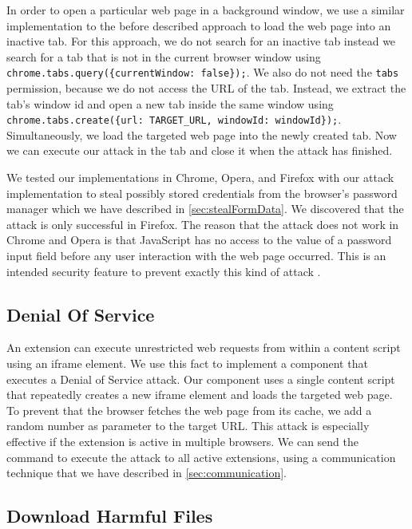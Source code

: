 	In order to open a particular web page in a background window, we use a similar implementation to the before described approach to load the web page into an inactive tab. For this approach, we do not search for an inactive tab instead we search for a tab that is not in the current browser window using \lstinline|chrome.tabs.query({currentWindow: false});|. We also do not need the \texttt{tabs} permission, because we do not access the URL of the tab. Instead, we extract the tab's window id and open a new tab inside the same window using \lstinline|chrome.tabs.create({url: TARGET_URL, windowId: windowId});|. Simultaneously, we load the targeted web page into the newly created tab. Now we can execute our attack in the tab and close it when the attack has finished.
	
	We tested our implementations in Chrome, Opera, and Firefox with our attack implementation to steal possibly stored credentials from the browser's password manager which we have described in \autoref{sec:stealFormData}. We discovered that the attack is only successful in Firefox. The reason that the attack does not work in Chrome and Opera is that JavaScript has no access to the value of a password input field before any user interaction with the web page occurred. This is an intended security feature to prevent exactly this kind of attack \cite{chromiumBlogPasswordInput}.


\subsection{Denial Of Service}
\label{sec:DoS}
	
	An extension can execute unrestricted web requests from within a content script using an iframe element. We use this fact to implement a component that executes a Denial of Service attack. Our component uses a single content script that repeatedly creates a new iframe element and loads the targeted web page. To prevent that the browser fetches the web page from its cache, we add a random number as parameter to the target URL. This attack is especially effective if the extension is active in multiple browsers. We can send the command to execute the attack to all active extensions, using a communication technique that we have described in \autoref{sec:communication}.

\subsection{Download Harmful Files}
\label{sec:downloads}

